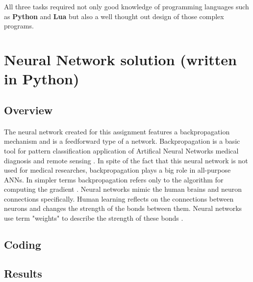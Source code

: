 \documentclass[12pt]{report}
\begin{document}
All three tasks required not only good knowledge of programming languages such as \textbf{Python} and \textbf{Lua} but also a well thought out design of those complex programs.


\clearpage

\section*{Neural Network solution (written in Python)}

\subsection*{Overview}
\paragraph{}

The neural network created for this assignment features a backpropagation mechanism and is a feedforward type of a network. Backpropagation is a basic tool for pattern classification application of Artifical
Neural Networks medical diagnosis and remote sensing \citep{NNArticle1}. In spite of the fact that this neural network is not used for medical researches, backpropagation plays a big role in all-purpose ANNs.
In simpler terms backpropagation refers only to the algorithm for computing the gradient \citep{wiki:Backpropagation}. Neural networks mimic the human brains and neuron connections specifically. Human learning
reflects on the connections between neurons and changes the strength of the bonds between them. Neural networks use term "weights" to describe the strength of these bonds \citep{NNArticle1}.


\subsection*{Coding}
\paragraph{}



\subsection*{Results}
\end{document}
